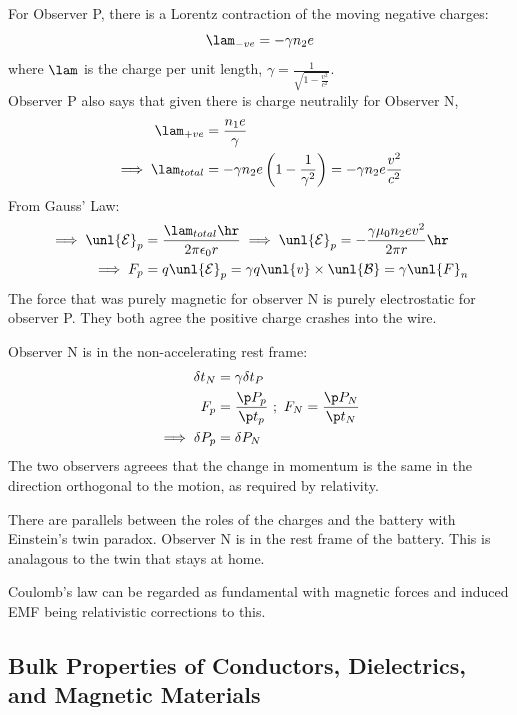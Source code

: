 \documentclass[a4paper, 11pt, normalem]{report}
\renewcommand\E{\mathcal{E}}
\newcommand\uE{\unl{\E}}
\renewcommand\B{\mathcal{B}}
\newcommand\uB{\unl{\B}}
\newcommand\eno{\epsilon_0}
\begin{document}
\chapter{}
For Observer P, there is a Lorentz contraction of the moving negative charges:
\begin{equation}
    \lam_{-ve} = -\gamma n_2e
\end{equation}
where $\lam$ is the charge per unit length, $\gamma = \frac{1}{\sqrt{1 - \tfrac{v^2}{c^2}}}$. \\
Observer P also says that given there is charge neutralily for Observer N,
\begin{align}
    \lam_{+ve} &= \frac{n_1 e}{\gamma} \\
    \implies \lam_{total} &= -\gamma n_2e \left(1 - \frac{1}{\gamma^2}\right) = -\gamma n_2e\frac{v^2}{c^2}
\end{align}
From Gauss' Law:
\begin{align}
    \implies \uE_p &= \frac{\lam_{total}\hr}{2\pi\eno r} \implies \uE_p = -\frac{\gamma \mu_0n_2ev^2}{2\pi r}\hr \\
    \implies F_p &= q\uE_p = \gamma q\unl{v} \times \uB = \gamma \unl{F}_n
\end{align}
The force that was purely magnetic for observer N is purely electrostatic for observer P.
They both agree the positive charge crashes into the wire.

Observer N is in the non-accelerating rest frame:
\begin{align}
    \delta t_N &= \gamma \delta t_P \\
    F_p &= \frac{\p P_p}{\p t_p} ~;~ F_N = \frac{\p P_N}{\p t_N} \\
    \implies \delta P_p &= \delta P_N
\end{align}
The two observers agreees that the change in momentum is the same in the direction orthogonal to the motion, as required by relativity.

There are parallels between the roles of the charges and the battery with Einstein's twin paradox.
Observer N is in the rest frame of the battery.
This is analagous to the twin that stays at home.

Coulomb's law can be regarded as fundamental with magnetic forces and induced EMF being relativistic corrections to this.

\section{Bulk Properties of Conductors, Dielectrics, and Magnetic Materials}
\end{document}
